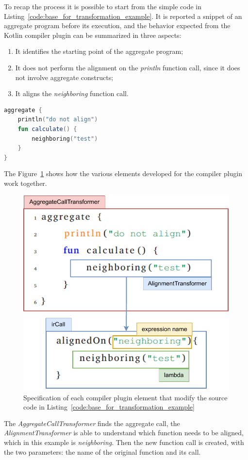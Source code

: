 To recap the process it is possible to start from the simple code in Listing~\ref{code:base_for_transformation_example}. It is reported a snippet of an aggregate program before its execution, and the behavior expected from the Kotlin compiler plugin can be summarized in three aspects:
\begin{enumerate}
    \item It identifies the starting point of the aggregate program;
    \item It does not perform the alignment on the \textit{println} function call, since it does not involve aggregate constructs;
    \item It aligns the \textit{neighboring} function call. 
\end{enumerate}
\begin{lstlisting}[caption={Base example of aggregate program}, captionpos=b, language=Kotlin, label={code:base_for_transformation_example}]
aggregate {
    println("do not align")
    fun calculate() {
        neighboring("test")
    }
}
\end{lstlisting}
The Figure~\ref{fig:ir_trasformation_with_code_elements} shows how the various elements developed for the compiler plugin work together.
\begin{figure}[!ht]
    \centering
    \includegraphics[scale=0.9]{document/chapters/3-alignment/images/ir_trasformation_with_code_elements.pdf}
    \caption{Specification of each compiler plugin element that modify the source code in Listing~\ref{code:base_for_transformation_example}}
    \label{fig:ir_trasformation_with_code_elements}
\end{figure}
The \textit{AggregateCallTransformer} finds the aggregate call, the \textit{AlignmentTransformer} is able to understand which function needs to be aligned, which in this example is \textit{neighboring}. Then the new function call is created, with the two parameters: the name of the original function and its call.

